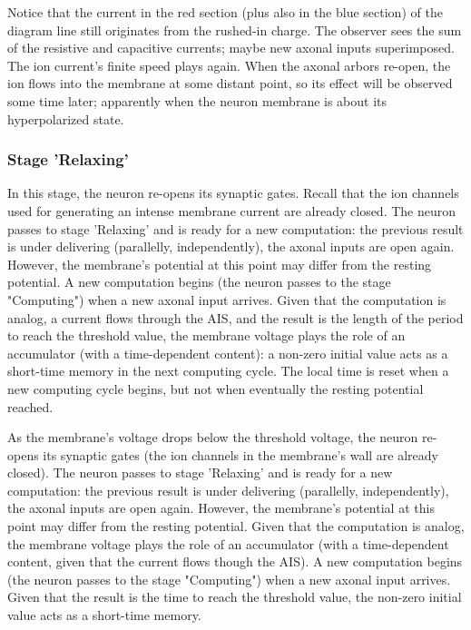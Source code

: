 Notice that the current in the red section (plus also in the blue section) 
of the diagram line still originates from the rushed-in charge. The observer
sees the sum of the resistive and capacitive currents;
maybe new axonal inputs superimposed.
The ion current's finite speed plays again. When the axonal arbors re-open,
the ion flows into the membrane at some distant point, so its effect
will be observed some time later; apparently when the neuron membrane is
about its hyperpolarized state. 

\subsubsection[Relaxing]{Stage 'Relaxing'\label{sec:Single-OperationRelaxing}}

In this stage,
the neuron re-opens its synaptic gates. Recall that the ion channels
used for generating an intense membrane current
are already closed. The neuron passes to stage 'Relaxing' and is ready for a new computation:
the previous result is under delivering (parallelly, independently),
the axonal inputs are open again. 
However, the membrane's potential at this point may differ from the
resting potential.  A new computation begins
(the neuron passes to the stage "Computing")
when a new axonal input arrives.  Given that the computation is analog, a current flows through the AIS, and the result is the length of the period to reach
the threshold value, the 
membrane voltage plays the role of an accumulator (with a time-dependent content): a non-zero initial value acts as a short-time memory in the next computing cycle.
The local time is reset when a new computing cycle begins, but not when eventually the resting potential reached.

As the membrane's voltage drops below the threshold voltage,
the neuron re-opens its synaptic gates (the ion channels in the membrane's wall
are already closed). The neuron passes to stage 'Relaxing' and is ready for a new computation:
the previous result is under delivering (parallelly, independently),
the axonal inputs are open again. 
However, the membrane's potential at this point may differ from the
resting potential. Given that the computation is analog, the 
membrane voltage plays the role of an accumulator (with a time-dependent content,
given that the current flows though the AIS). A new computation begins
(the neuron passes to the stage "Computing")
when a new axonal input arrives. Given that the result is the time to reach
the threshold value, the non-zero initial value acts as a short-time memory.

